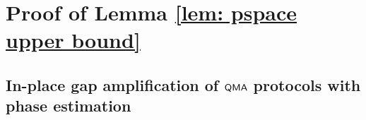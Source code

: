 \documentclass[a4paper,UKenglish]{lipics-v2016}
\newcommand\QMA{{\sf{QMA}}}
\newcommand\qca[1]{\ensuremath{#1}\textit{-Quantum Circuit Acceptance}}
\newcommand{\zero}{\ensuremath{0^{\otimes{k(n)}}}}
\newcommand\bigoh{\mathcal{O}}
\begin{document}
%
\section{Proof of Lemma \ref{lem: pspace upper bound}} \label{app: pspace upper bound}
\subsection{In-place gap amplification of $\QMA$ protocols with phase estimation}\label{app: space efficient amplification}
\end{document}
